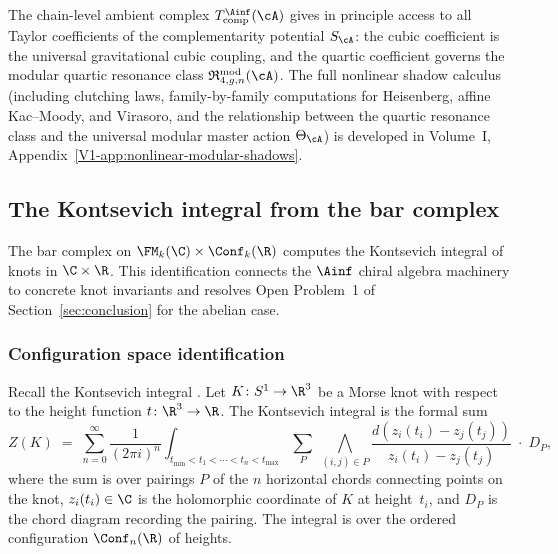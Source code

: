 \begin{remark}
The chain-level ambient complex
$T_{\mathrm{comp}}^{\Ainf}(\cA)$ gives in principle
access to all Taylor coefficients of the complementarity
potential $S_\cA$: the cubic coefficient is the universal
gravitational cubic coupling, and the quartic coefficient
governs the modular quartic resonance class
$\mathfrak{R}_{4,g,n}^{\mathrm{mod}}(\cA)$. The full
nonlinear shadow calculus (including clutching laws,
family-by-family computations for Heisenberg, affine Kac--Moody,
and Virasoro, and the relationship between the quartic
resonance class and the universal modular master action
$\Theta_\cA$) is developed in Volume~I,
Appendix~\ref*{V1-app:nonlinear-modular-shadows}.
\end{remark}


\subsection{The Kontsevich integral from the bar complex}

The bar complex on $\FM_k(\C) \times \Conf_k(\R)$ computes the
Kontsevich integral of knots in $\C \times \R$. This
identification connects the $\Ainf$ chiral algebra machinery to
concrete knot invariants and resolves Open Problem~1 of
Section~\ref{sec:conclusion} for the abelian case.

\subsubsection{Configuration space identification}

Recall the Kontsevich integral \cite{Kon94}. Let
$K \colon S^1 \to \R^3$ be a Morse knot with respect to the
height function $t \colon \R^3 \to \R$. The Kontsevich integral
is the formal sum
\begin{equation}
Z(K) \;=\; \sum_{n=0}^{\infty} \frac{1}{(2\pi i)^n}
\int_{t_{{\min}} < t_1 < \cdots < t_n < t_{{\max}}}
\sum_{P} \;\bigwedge_{(i,j) \in P}
\frac{d(z_i(t_i) - z_j(t_j))}{z_i(t_i) - z_j(t_j)}
\;\cdot\; D_P,
\end{equation}
where the sum is over pairings $P$ of the $n$ horizontal chords
connecting points on the knot, $z_i(t_i) \in \C$ is the
holomorphic coordinate of $K$ at height~$t_i$, and $D_P$ is
the chord diagram recording the pairing. The integral is over
the ordered configuration $\Conf_n(\R)$ of heights.


